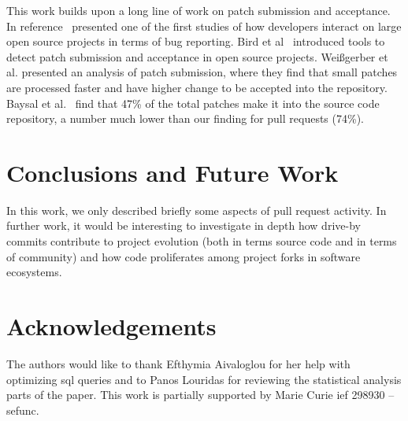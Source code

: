 \documentclass{sig-alternate}
\begin{document}
This work builds upon a long line of work on patch submission and acceptance.
In reference~\cite{MOCKU02} presented one of the first studies of how developers
interact on large open source projects in terms of bug reporting.  Bird et
al~\cite{Bird07a} introduced tools to detect patch submission and acceptance in
open source projects. Wei\ss gerber et al. presented an analysis of patch
submission, where they find that small patches are processed faster and have
higher change to be accepted into the repository. Baysal et al.~\cite{Baysa12}
find that 47\% of the total patches make it into the source code repository, a
number much lower than our finding for pull requests (74\%).

\section{Conclusions and Future Work}

In this work, we only described briefly some aspects of pull request activity.
In further work, it would be interesting to investigate in depth how drive-by
commits contribute to project evolution (both in terms source code and in
terms of community) and how code proliferates among project
forks in software ecosystems.

\section*{Acknowledgements}

The authors would like to thank Efthymia Aivaloglou for her help with 
optimizing {\sc sql} queries and to Panos Louridas for reviewing the 
statistical analysis parts of the paper.
This work is partially supported by Marie Curie {\sc ief} 298930 -- {\sc sefunc}.



\end{document}
